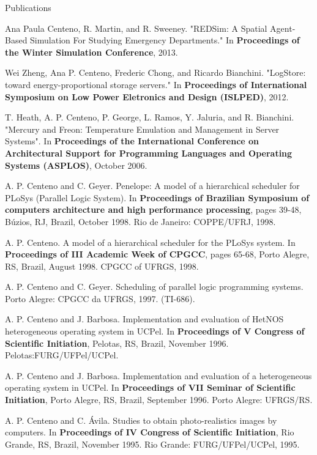 \documentclass[10pt]{resume}
\begin{document}
\begin{category}{Publications}

  \citem Ana Paula Centeno, R. Martin, and R. Sweeney. "REDSim: A
  Spatial Agent-Based Simulation For Studying Emergency Departments."
  In {\bf Proceedings of the Winter Simulation Conference}, 2013.

  \citem Wei Zheng, Ana P. Centeno, Frederic Chong, and Ricardo
  Bianchini. "LogStore: toward energy-proportional storage servers."
  In {\bf Proceedings of International Symposium on Low Power
    Eletronics and Design (ISLPED)}, 2012.

  \citem T. Heath, A. P. Centeno, P. George, L. Ramos,
  Y. Jaluria, and R. Bianchini. "Mercury and Freon: Temperature
  Emulation and Management in Server Systems". In {\bf Proceedings of
    the International Conference on Architectural Support for
    Programming Languages and Operating Systems (ASPLOS)}, October
  2006.

  \citem A. P. Centeno and C. Geyer. Penelope: A
  model of a hierarchical scheduler for PLoSys (Parallel
  Logic System). In {\bf Proceedings of Brazilian Symposium of computers
    architecture and high performance processing}, pages 39-48, B\'uzios,
  RJ, Brazil, October 1998. Rio de Janeiro: COPPE/UFRJ,
  1998.

  \citem A. P. Centeno. A model of a hierarchical scheduler for
  the PLoSys system. In {\bf Proceedings of III Academic Week of CPGCC}, 
  pages 65-68, Porto Alegre, RS, Brazil, August 1998. CPGCC of UFRGS, 
  1998.

  \citem A. P. Centeno and C. Geyer. Scheduling
    of parallel logic programming systems. Porto Alegre: CPGCC da
  UFRGS, 1997. (TI-686). 

  \citem A. P. Centeno and J. Barbosa. Implementation and
  evaluation of HetNOS heterogeneous operating system in UCPel. In
  {\bf Proceedings of V Congress of Scientific Initiation}, Pelotas, RS,
  Brazil, November 1996. Pelotas:FURG/UFPel/UCPel.
  
  \citem A. P. Centeno and J. Barbosa. Implementation and
  evaluation of a heterogeneous operating system in UCPel. In
  {\bf Proceedings of VII Seminar of Scientific Initiation}, Porto Alegre, RS,
  Brazil, September 1996. Porto Alegre: UFRGS/RS. 

  \citem A. P. Centeno and C. \'Avila. Studies to
  obtain photo-realistics images by computers. In {\bf Proceedings of IV 
    Congress of Scientific Initiation}, Rio Grande, RS, Brazil, November 1995.
  Rio Grande: FURG/UFPel/UCPel, 1995. 

\end{category}
\end{document}
